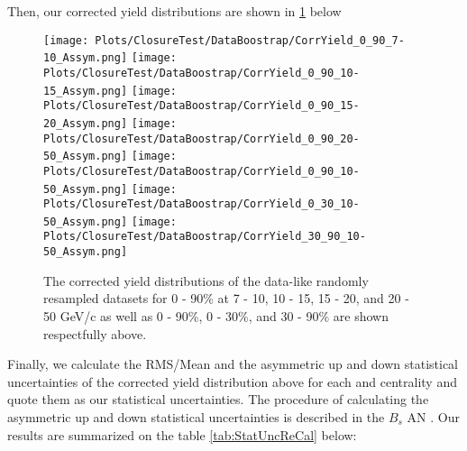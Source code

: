 \clearpage


Then, our corrected yield distributions are shown in \ref{fig:CorrStatClosure} below



\begin{figure}[h]
\begin{center}
\texttt{[image: Plots/ClosureTest/DataBoostrap/CorrYield\_0\_90\_7-10\_Assym.png]}
\texttt{[image: Plots/ClosureTest/DataBoostrap/CorrYield\_0\_90\_10-15\_Assym.png]}
\texttt{[image: Plots/ClosureTest/DataBoostrap/CorrYield\_0\_90\_15-20\_Assym.png]}
\texttt{[image: Plots/ClosureTest/DataBoostrap/CorrYield\_0\_90\_20-50\_Assym.png]}
\texttt{[image: Plots/ClosureTest/DataBoostrap/CorrYield\_0\_90\_10-50\_Assym.png]}
\texttt{[image: Plots/ClosureTest/DataBoostrap/CorrYield\_0\_30\_10-50\_Assym.png]}
\texttt{[image: Plots/ClosureTest/DataBoostrap/CorrYield\_30\_90\_10-50\_Assym.png]}  
\caption{The corrected yield distributions of the data-like randomly resampled datasets for 0 - 90\% at 7 - 10, 10 - 15, 15 - 20, and 20 - 50 GeV/c as well as 0 - 90\%, 0 - 30\%, and 30 - 90\% are shown respectfully above.} 
\label{fig:CorrStatClosure} 
\end{center}
\end{figure}


Finally, we calculate the RMS/Mean and the asymmetric up and down statistical uncertainties of the corrected yield distribution above for each \pt and centrality and quote them as our statistical uncertainties. The procedure of calculating the asymmetric up and down statistical uncertainties is described in the $B_s$ AN \cite{AN-19-055}. Our results are summarized on the table \ref{tab:StatUncReCal} below: 



